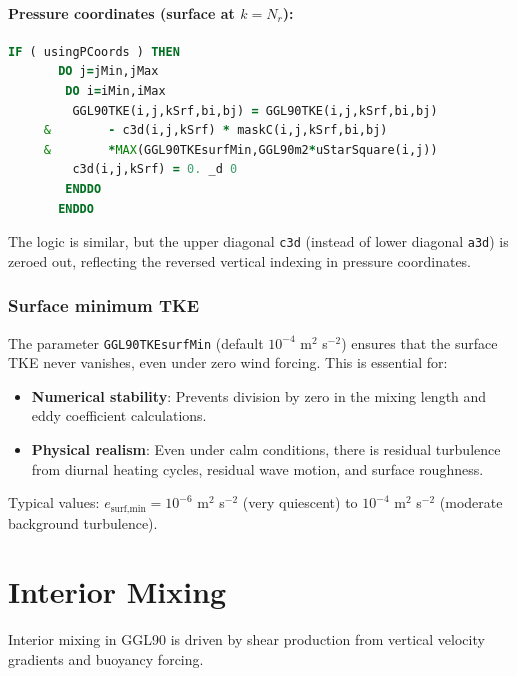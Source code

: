 \documentclass[12pt,letterpaper]{article}
\begin{document}
\paragraph{Pressure coordinates (surface at $k=N_r$):}

\begin{lstlisting}[language=Fortran,caption={(ggl90\_calc.F:L883--897) Surface BC in pressure coordinates}]
      IF ( usingPCoords ) THEN
       DO j=jMin,jMax
        DO i=iMin,iMax
         GGL90TKE(i,j,kSrf,bi,bj) = GGL90TKE(i,j,kSrf,bi,bj)
     &        - c3d(i,j,kSrf) * maskC(i,j,kSrf,bi,bj)
     &        *MAX(GGL90TKEsurfMin,GGL90m2*uStarSquare(i,j))
         c3d(i,j,kSrf) = 0. _d 0
        ENDDO
       ENDDO
\end{lstlisting}

The logic is similar, but the upper diagonal \verb|c3d| (instead of lower diagonal \verb|a3d|) is zeroed out, reflecting the reversed vertical indexing in pressure coordinates.

\subsubsection{Surface minimum TKE}

The parameter \verb|GGL90TKEsurfMin| (default $10^{-4}$ m$^2$ s$^{-2}$) ensures that the surface TKE never vanishes, even under zero wind forcing. This is essential for:
\begin{itemize}
\item \textbf{Numerical stability}: Prevents division by zero in the mixing length and eddy coefficient calculations.
\item \textbf{Physical realism}: Even under calm conditions, there is residual turbulence from diurnal heating cycles, residual wave motion, and surface roughness.
\end{itemize}

Typical values: $e_{\text{surf,min}} = 10^{-6}$ m$^2$ s$^{-2}$ (very quiescent) to $10^{-4}$ m$^2$ s$^{-2}$ (moderate background turbulence).

\section{Interior Mixing}
\label{sec:interior_mixing}

Interior mixing in GGL90 is driven by shear production from vertical velocity gradients and buoyancy forcing.
\end{document}
